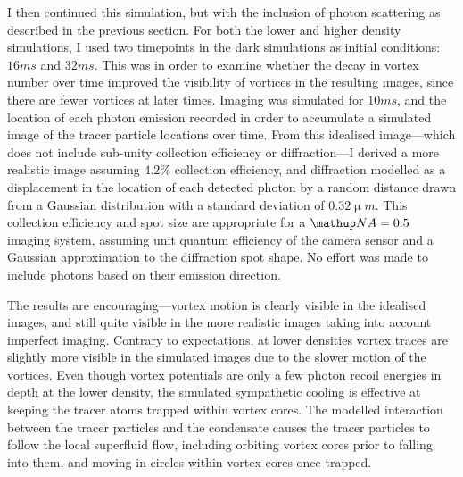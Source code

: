 I then continued this simulation, but with the inclusion of photon scattering as described in the previous section. For both the lower and higher density simulations, I used two timepoints in the dark simulations as initial conditions: $16\unit{ms}$ and $32\unit{ms}$. This was in order to examine whether the decay in vortex number over time improved the visibility of vortices in the resulting images, since there are fewer vortices at later times. Imaging was simulated for $10\unit{ms}$, and the location of each photon emission recorded in order to accumulate a simulated image of the tracer particle locations over time. From this idealised image---which does not include sub-unity collection efficiency or diffraction---I derived a more realistic image assuming $4.2 \%$ collection efficiency, and diffraction modelled as a displacement in the location of each detected photon by a random distance drawn from a Gaussian distribution with a standard deviation of $0.32\unit{\upmu m}$. This collection efficiency and spot size are appropriate for a $\up{NA}=0.5$ imaging system, assuming unit quantum efficiency of the camera sensor and a Gaussian approximation to the diffraction spot shape. No effort was made to include photons based on their emission direction.

The results are encouraging---vortex motion is clearly visible in the idealised images, and still quite visible in the more realistic images taking into account imperfect imaging. Contrary to expectations, at lower densities vortex traces are slightly more visible in the simulated images due to the slower motion of the vortices. Even though vortex potentials are only a few photon recoil energies in depth at the lower density, the simulated sympathetic cooling is effective at keeping the tracer atoms trapped within vortex cores. The modelled interaction between the tracer particles and the condensate causes the tracer particles to follow the local superfluid flow, including orbiting vortex cores prior to falling into them, and moving in circles within vortex cores once trapped.



